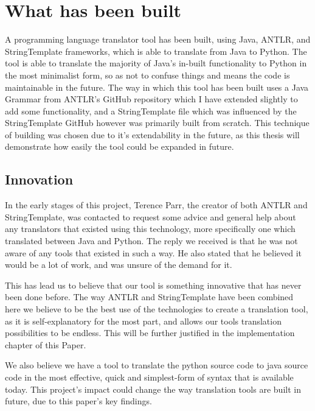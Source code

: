 \documentclass{l4proj}
\begin{document}
\section{What has been built}
A programming language translator tool has been built, using Java, ANTLR, and StringTemplate frameworks, which is able to translate from Java to Python. The tool is able to translate the majority of Java's in-built functionality to Python in the most minimalist form, so as not to confuse things and means the code is maintainable in the future. The way in which this tool has been built uses a Java Grammar from ANTLR's GitHub repository which I have extended slightly to add some functionality, and a StringTemplate file which was influenced by the StringTemplate GitHub however was primarily built from scratch. This technique of building was chosen due to it's extendability in the future, as this thesis will demonstrate how easily the tool could be expanded in future.

\subsection{Innovation}
In the early stages of this project, Terence Parr, the creator of both ANTLR and StringTemplate, was contacted to request some advice and general help about any translators that existed using this technology, more specifically one which translated between Java and Python. The reply we received is that he was not aware of any tools that existed in such a way. He also stated that he believed it would be a lot of work, and was unsure of the demand for it.

This has lead us to believe that our tool is something innovative that has never been done before. The way ANTLR and StringTemplate have been combined here we believe to be the best use of the technologies to create a translation tool, as it is self-explanatory for the most part, and allows our tools translation possibilities to be endless. This will be further justified in the implementation chapter of this Paper.

We also believe we have a tool to translate the python source code to java source code in the most effective, quick and simplest-form of syntax that is available today. This project's impact could change the way translation tools are built in future, due to this paper's key findings.
\end{document}

